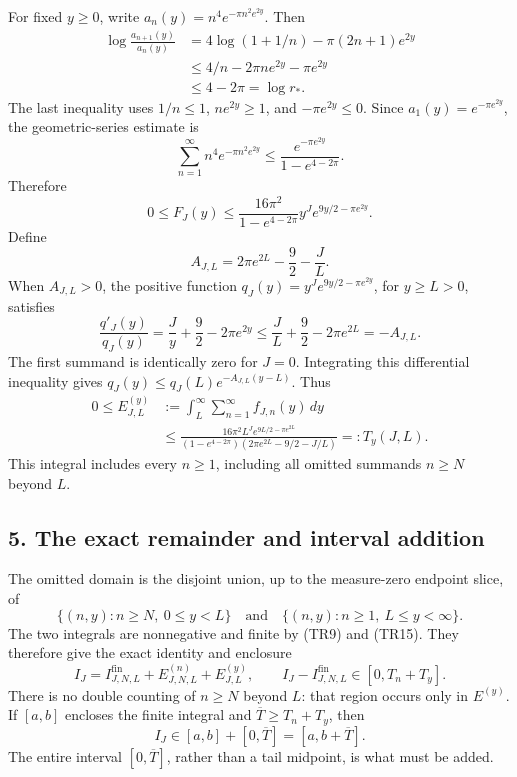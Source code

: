 For fixed \(y\geq0\), write \(a_n(y)=n^4e^{-\pi n^2e^{2y}}\). Then \[
 \begin{aligned}
 \log\frac{a_{n+1}(y)}{a_n(y)}
 &=4\log(1+1/n)-\pi(2n+1)e^{2y}\\
 &\leq4/n-2\pi ne^{2y}-\pi e^{2y}\\
 &\leq4-2\pi=\log r_*.
 \end{aligned}
 \tag{TR10}
\] The last inequality uses \(1/n\leq1\), \(ne^{2y}\geq1\), and \(-\pi e^{2y}\leq0\). Since \(a_1(y)=e^{-\pi e^{2y}}\), the geometric-series estimate is \[
 \sum_{n=1}^{\infty}n^4e^{-\pi n^2e^{2y}}
 \leq\frac{e^{-\pi e^{2y}}}{1-e^{4-2\pi}}.
 \tag{TR11}
\] Therefore \[
 0\leq F_J(y)
 \leq \frac{16\pi^2}{1-e^{4-2\pi}}
 y^Je^{9y/2-\pi e^{2y}}.
 \tag{TR12}
\] Define \[
 A_{J,L}=2\pi e^{2L}-\frac92-\frac JL.
 \tag{TR13}
\] When \(A_{J,L}>0\), the positive function \(q_J(y)=y^Je^{9y/2-\pi e^{2y}}\), for \(y\geq L>0\), satisfies \[
 \frac{q'_J(y)}{q_J(y)}
 =\frac Jy+\frac92-2\pi e^{2y}
 \leq\frac JL+\frac92-2\pi e^{2L}
 =-A_{J,L}.
 \tag{TR14}
\] The first summand is identically zero for \(J=0\). Integrating this differential inequality gives \(q_J(y)\leq q_J(L)e^{-A_{J,L}(y-L)}\). Thus \[
 \begin{aligned}
 0\leq E_{J,L}^{(y)}
 &:=\int_L^\infty\sum_{n=1}^{\infty}f_{J,n}(y)\,dy\\
 &\leq
 \frac{16\pi^2L^Je^{9L/2-\pi e^{2L}}}
 {(1-e^{4-2\pi})(2\pi e^{2L}-9/2-J/L)}
 =:T_y(J,L).
 \end{aligned}
 \tag{TR15}
\] This integral includes every \(n\geq1\), including all omitted summands \(n\geq N\) beyond \(L\).

\subsection{5. The exact remainder and interval addition}\label{C47stage:TR:the-exact-remainder-and-interval-addition}

The omitted domain is the disjoint union, up to the measure-zero endpoint slice, of \[
 \{(n,y):n\geq N,\ 0\leq y<L\}
 \quad\text{and}\quad
 \{(n,y):n\geq1,\ L\leq y<\infty\}.
 \tag{TR16}
\] The two integrals are nonnegative and finite by (TR9) and (TR15). They therefore give the exact identity and enclosure \[
 I_J=I_{J,N,L}^{\mathrm{fin}}+E_{J,N,L}^{(n)}+E_{J,L}^{(y)},
 \qquad
 I_J-I_{J,N,L}^{\mathrm{fin}}\in[0,T_n+T_y].
 \tag{TR17}
\] There is no double counting of \(n\geq N\) beyond \(L\): that region occurs only in \(E^{(y)}\). If \([a,b]\) encloses the finite integral and \(\overline T\geq T_n+T_y\), then \[
 I_J\in[a,b]+[0,\overline T]=[a,b+\overline T].
 \tag{TR18}
\] The entire interval \([0,\overline T]\), rather than a tail midpoint, is what must be added.

